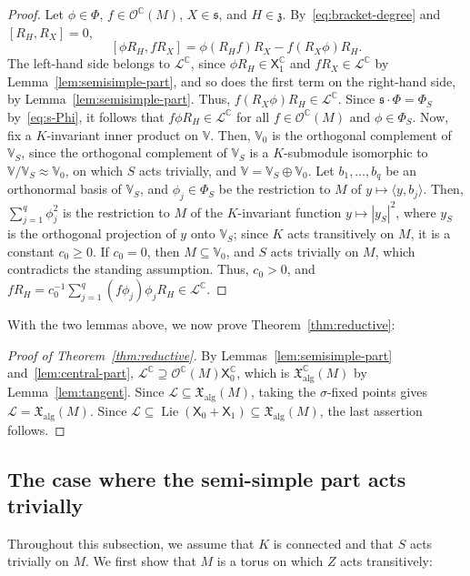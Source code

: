 \documentclass{article}
\newcommand{\C}{\mathbb{C}}
\newcommand{\fraks}{\mathfrak{s}}
\newcommand{\frakz}{\mathfrak{z}}
\newcommand{\xalg}{\mathfrak X_{\mathrm{alg}}}
\newcommand{\sX}{\mathsf{X}}
\newcommand{\Ocal}{\mathcal{O}}
\newcommand{\cL}{\mathcal{L}}
\theoremstyle{definition}
\theoremstyle{plain}
\begin{document}
\begin{proof}
Let $\phi\in\Phi$, $f\in\Ocal^\C(M)$, $X\in\fraks$, and $H\in\frakz$. By~\eqref{eq:bracket-degree} and $[R_H,R_X]=0$,
$$
[\phi R_H,fR_X]=\phi(R_Hf)R_X-f(R_X\phi)R_H.
$$
The left-hand side belongs to $\cL^\C$, since $\phi R_H\in\sX_1^\C$ and $fR_X\in\cL^\C$ by Lemma~\ref{lem:semisimple-part}, and so does the first term on the right-hand side, by Lemma~\ref{lem:semisimple-part}. Thus, $f(R_X\phi)R_H\in\cL^\C$.
Since $\fraks\cdot\Phi=\Phi_S$ by~\eqref{eq:s-Phi}, it follows that $f\phi R_H\in\cL^\C$ for all $f\in\Ocal^\C(M)$ and $\phi\in\Phi_S$.
Now, fix a $K$-invariant inner product on $\mathbb V$. Then, $\mathbb V_0$ is the orthogonal complement of $\mathbb V_S$, since the orthogonal complement of $\mathbb V_S$ is a $K$-submodule isomorphic to $\mathbb V/\mathbb V_S\approx\mathbb V_0$, on which $S$ acts trivially, and $\mathbb V=\mathbb V_S\oplus\mathbb V_0$.
Let $b_1,\ldots,b_q$ be an orthonormal basis of $\mathbb V_S$, and $\phi_j\in\Phi_S$ be the restriction to $M$ of $y\mapsto\langle y,b_j\rangle$.
Then, $\sum_{j=1}^q\phi_j^2$ is the restriction to $M$ of the $K$-invariant function $y\mapsto|y_S|^2$, where $y_S$ is the orthogonal projection of $y$ onto $\mathbb V_S$; since $K$ acts transitively on $M$, it is a constant $c_0\geq0$.
If $c_0=0$, then $M\subseteq \mathbb V_0$, and $S$ acts trivially on $M$, which contradicts the standing assumption.
Thus, $c_0>0$, and $fR_H=c_0^{-1}\sum_{j=1}^q(f\phi_j)\phi_jR_H\in\cL^\C$.
\end{proof}

With the two lemmas above, we now prove Theorem~\ref{thm:reductive}:

\begin{proof}[Proof of Theorem~\ref{thm:reductive}]
By Lemmas~\ref{lem:semisimple-part} and~\ref{lem:central-part}, $\cL^\C\supseteq\Ocal^\C(M)\sX_0^\C$, which is $\xalg^\C(M)$ by Lemma~\ref{lem:tangent}.
Since $\cL\subseteq\xalg(M)$, taking the $\sigma$-fixed points gives $\cL=\xalg(M)$.
Since $\cL\subseteq\operatorname{Lie}(\sX_0+\sX_1)\subseteq\xalg(M)$, the last assertion follows.
\end{proof}


\subsection{The case where the semi-simple part acts trivially}\label{ssec:tori}


 Throughout this subsection, we assume that $K$ is connected and that $S$ acts trivially on $M$.
We first show that $M$ is a torus on which $Z$ acts transitively:
\end{document}
